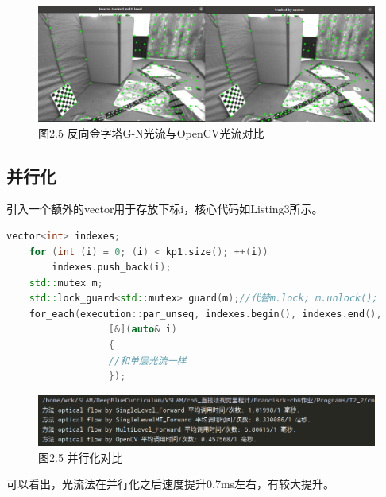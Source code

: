 \documentclass[40pt,a4paper，UTF8]{ctexart}
\numberwithin{equation}{section}
\begin{document}
\begin{figure}[H]
\centering
\includegraphics[width=4.8in]{ch6_2_4.png} {图2.5  反向金字塔G-N光流与OpenCV光流对比}
\end{figure}


\subsection{并行化}
引入一个额外的vector用于存放下标i，核心代码如Listing3所示。
\begin{lstlisting}[language=C++, caption=并行化核心代码]
    vector<int> indexes;
    for (int (i) = 0; (i) < kp1.size(); ++(i))
        indexes.push_back(i);
    std::mutex m;
    std::lock_guard<std::mutex> guard(m);//代替m.lock; m.unlock();
    for_each(execution::par_unseq, indexes.begin(), indexes.end(),
                  [&](auto& i)
                  {
                  //和单层光流一样
                  });
\end{lstlisting}

\begin{figure}[H]
\centering
\includegraphics[width=4.8in]{ch6_2_6.png} {图2.5 并行化对比}
\end{figure}

可以看出，光流法在并行化之后速度提升0.7ms左右，有较大提升。
\end{document}
